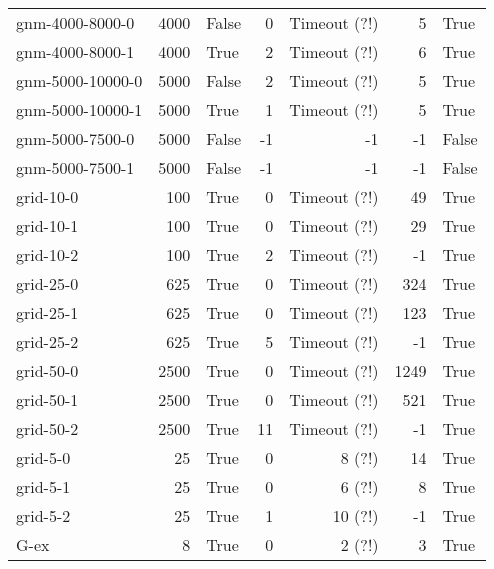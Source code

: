 \begin{longtable}{lrlrrrl}
gnm-4000-8000-0 & 4000 & False & 0 & Timeout (?!) & 5 & True \\

gnm-4000-8000-1 & 4000 & True & 2 & Timeout (?!) & 6 & True \\

gnm-5000-10000-0 & 5000 & False & 2 & Timeout (?!) & 5 & True \\

gnm-5000-10000-1 & 5000 & True & 1 & Timeout (?!) & 5 & True \\

gnm-5000-7500-0 & 5000 & False & -1 & -1 & -1 & False \\

gnm-5000-7500-1 & 5000 & False & -1 & -1 & -1 & False \\

grid-10-0 & 100 & True & 0 & Timeout (?!) & 49 & True \\

grid-10-1 & 100 & True & 0 & Timeout (?!) & 29 & True \\

grid-10-2 & 100 & True & 2 & Timeout (?!) & -1 & True \\

grid-25-0 & 625 & True & 0 & Timeout (?!) & 324 & True \\

grid-25-1 & 625 & True & 0 & Timeout (?!) & 123 & True \\

grid-25-2 & 625 & True & 5 & Timeout (?!) & -1 & True \\

grid-50-0 & 2500 & True & 0 & Timeout (?!) & 1249 & True \\

grid-50-1 & 2500 & True & 0 & Timeout (?!) & 521 & True \\

grid-50-2 & 2500 & True & 11 & Timeout (?!) & -1 & True \\

grid-5-0 & 25 & True & 0 & 8 (?!) & 14 & True \\

grid-5-1 & 25 & True & 0 & 6 (?!) & 8 & True \\

grid-5-2 & 25 & True & 1 & 10 (?!) & -1 & True \\

G-ex & 8 & True & 0 & 2 (?!) & 3 & True \\


\end{longtable}
